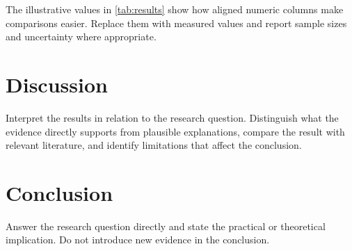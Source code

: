 \documentclass[11pt,a4paper]{article}
\begin{document}
The illustrative values in \autoref{tab:results} show how aligned numeric
columns make comparisons easier. Replace them with measured values and report
sample sizes and uncertainty where appropriate.

\section{Discussion}

Interpret the results in relation to the research question. Distinguish what
the evidence directly supports from plausible explanations, compare the
result with relevant literature, and identify limitations that affect the
conclusion.

\section{Conclusion}

Answer the research question directly and state the practical or theoretical
implication. Do not introduce new evidence in the conclusion.

\printbibliography
\end{document}
